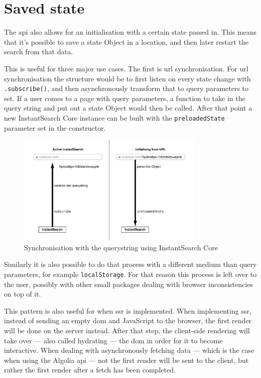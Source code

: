 
\section{Saved state} %
\label{sec:saved_state}

The \acrshort{api} also allows for an initialisation with a certain state passed in. This means that it's possible to save a state Object in a location, and then later restart the search from that data. 

This is useful for three major use cases. The first is \acrshort{url} synchronisation. For \acrshort{url} synchronisation the structure would be to first listen on every state change with {\tt .subscribe()}, and then asynchronously transform that to query parameters to set. If a user comes to a page with query parameters, a function to take in the query string and put out a state Object would then be called. After that point a new InstantSearch Core instance can be built with the {\tt preloadedState} parameter set in the constructor.

\begin{figure}[H]
  \centering
  \includegraphics[width=0.8\textwidth]{../assets/is-core-url-sync.pdf}
  \caption{Synchronisation with the querystring using InstantSearch Core}
  \label{figure:is-core-url-sync}
\end{figure} %

Similarly it is also possible to do that process with a different medium than query parameters, for example {\tt localStorage}. For that reason this process is left over to the user, possibly with other small packages dealing with browser inconsistencies on top of it. 

This pattern is also useful for when \acrfull{ssr} is implemented. When implementing \acrlong{ssr}, instead of sending an empty \acrshort{dom} and JavaScript to the browser, the first render will be done on the server instead. After that step, the client-side rendering will take over --- also called hydrating --- the \acrshort{dom} in order for it to become interactive. When dealing with asynchronously fetching data --- which is the case when using the Algolia \acrshort{api} --- not the first render will be sent to the client, but rather the first render after a fetch has been completed.

